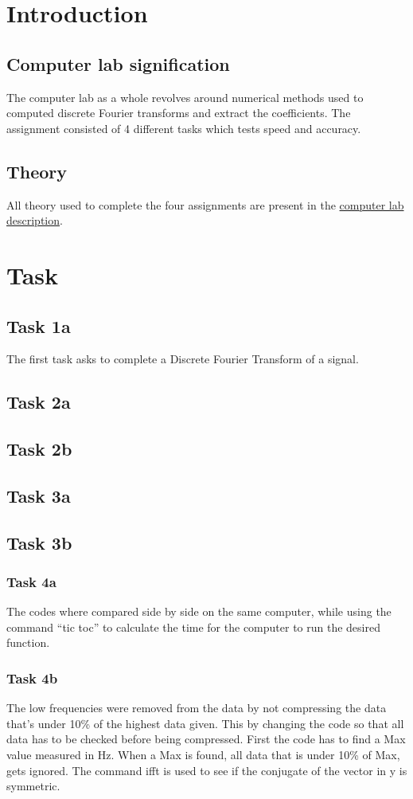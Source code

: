 
\section{Introduction}
\subsection{Computer lab signification}
The computer lab as a whole revolves around numerical methods used to computed discrete Fourier transforms and extract the coefficients. The assignment consisted of 4 different tasks which tests speed and accuracy.


\subsection{Theory}
All theory used to complete the four assignments are present in the \href{https://www.canvas.umu.se/courses/6692/files/folder/Datorlaboration?preview=1394099}{computer lab description}.
\section{Task}
\subsection{Task 1a}
The first task asks to complete a Discrete Fourier Transform of a signal.
\subsection{Task 2a}
\subsection{Task 2b}
\subsection{Task 3a}
\subsection{Task 3b}


\subsubsection{Task 4a}
The codes where compared side by side on the same computer, while using the command “tic toc” to calculate the time for the computer to run the desired function.

\subsubsection{Task 4b}
The low frequencies were removed from the data by not compressing the data that’s under 10\%  of the highest data given. This by changing the code so that all data has to be checked before being compressed. First the code has to find a Max value measured in Hz. When a Max is found, all data that is under 10\% of Max, gets ignored. The command ifft is used to see if the conjugate of the vector in y is symmetric.  

